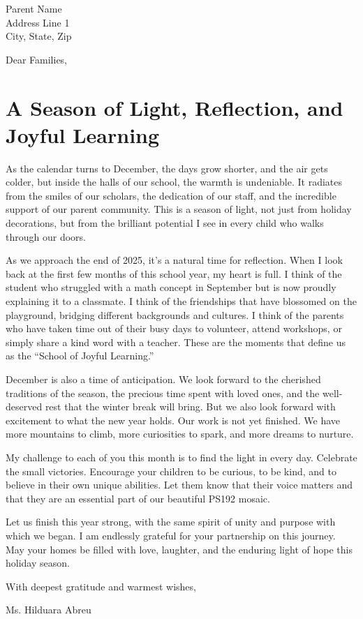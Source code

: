 \documentclass[12pt]{article}
\begin{document}
\psletterhead

\vspace{1cm}

Parent Name \\
Address Line 1 \\
City, State, Zip

\vspace{1cm}

Dear Families,
\section*{A Season of Light, Reflection, and Joyful Learning}
\label{sec:orge09bf33}

As the calendar turns to December, the days grow shorter, and the air gets colder, but inside the halls of our school, the warmth is undeniable. It radiates from the smiles of our scholars, the dedication of our staff, and the incredible support of our parent community. This is a season of light, not just from holiday decorations, but from the brilliant potential I see in every child who walks through our doors.

As we approach the end of 2025, it’s a natural time for reflection. When I look back at the first few months of this school year, my heart is full. I think of the student who struggled with a math concept in September but is now proudly explaining it to a classmate. I think of the friendships that have blossomed on the playground, bridging different backgrounds and cultures. I think of the parents who have taken time out of their busy days to volunteer, attend workshops, or simply share a kind word with a teacher. These are the moments that define us as the ``School of Joyful Learning.''

December is also a time of anticipation. We look forward to the cherished traditions of the season, the precious time spent with loved ones, and the well-deserved rest that the winter break will bring. But we also look forward with excitement to what the new year holds. Our work is not yet finished. We have more mountains to climb, more curiosities to spark, and more dreams to nurture.

My challenge to each of you this month is to find the light in every day. Celebrate the small victories. Encourage your children to be curious, to be kind, and to believe in their own unique abilities. Let them know that their voice matters and that they are an essential part of our beautiful PS192 mosaic.

Let us finish this year strong, with the same spirit of unity and purpose with which we began. I am endlessly grateful for your partnership on this journey. May your homes be filled with love, laughter, and the enduring light of hope this holiday season.

\vspace{1cm}

With deepest gratitude and warmest wishes,

\vspace{1cm}

Ms. Hilduara Abreu
\end{document}
